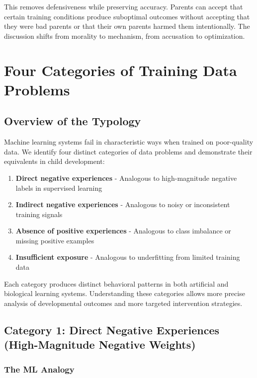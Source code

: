 \documentclass{article}
\begin{document}
This removes defensiveness while preserving accuracy. Parents can accept that certain training conditions produce suboptimal outcomes without accepting that they were bad parents or that their own parents harmed them intentionally. The discussion shifts from morality to mechanism, from accusation to optimization.

\section{Four Categories of Training Data Problems}

\subsection{Overview of the Typology}

Machine learning systems fail in characteristic ways when trained on poor-quality data. We identify four distinct categories of data problems and demonstrate their equivalents in child development:

\begin{enumerate}
\item \textbf{Direct negative experiences} - Analogous to high-magnitude negative labels in supervised learning
\item \textbf{Indirect negative experiences} - Analogous to noisy or inconsistent training signals
\item \textbf{Absence of positive experiences} - Analogous to class imbalance or missing positive examples
\item \textbf{Insufficient exposure} - Analogous to underfitting from limited training data
\end{enumerate}

Each category produces distinct behavioral patterns in both artificial and biological learning systems. Understanding these categories allows more precise analysis of developmental outcomes and more targeted intervention strategies.

\subsection{Category 1: Direct Negative Experiences (High-Magnitude Negative Weights)}

\subsubsection{The ML Analogy}
\end{document}
